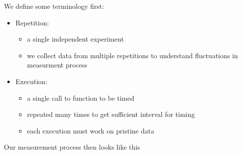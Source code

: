 \documentclass[sigconf, nonacm, natbib, screen, balance=False]{acmart}
\begin{document}
We define some terminology first:
  \begin{itemize}
    \item
    Repetition:

    \begin{itemize}
        \item
      a single independent experiment
    \item
      we collect data from multiple repetitions to understand
      fluctuations in measurment process
    \end{itemize}
  \item
    Execution:

    \begin{itemize}
        \item
      a single call to function to be timed
    \item
      repeated many times to get sufficient interval for timing
    \item
      each execution must work on pristine data
    \end{itemize}
  \end{itemize}



Our measurement process then looks like this
\end{document}
